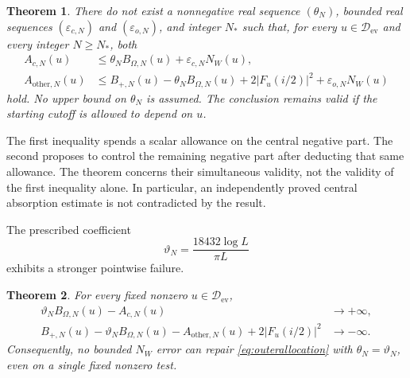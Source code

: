\documentclass[11pt]{article}
\newtheorem{theorem}{Theorem}[section]
\theoremstyle{remark}
\newcommand{\core}{\mathcal D_{\mathrm{ev}}}
\newcommand{\NW}{N_W}
\numberwithin{equation}{section}
\begin{document}
\begin{theorem}\label{thm:nogo}
There do not exist a nonnegative real sequence $(\theta_N)$, bounded real sequences $(\varepsilon_{c,N})$ and $(\varepsilon_{o,N})$, and integer $N_*$ such that, for every $u\in\core$ and every integer $N\ge N_*$, both
\begin{align}
 A_{c,N}(u)&\le\theta_NB_{\Omega,N}(u)+\varepsilon_{c,N}\NW(u),\label{eq:centralallocation}\\
 A_{\mathrm{other},N}(u)&\le B_{+,N}(u)-\theta_NB_{\Omega,N}(u)
       +2|F_u(i/2)|^2+\varepsilon_{o,N}\NW(u)\label{eq:outerallocation}
\end{align}
 hold. No upper bound on $\theta_N$ is assumed. The conclusion remains valid if the starting cutoff is allowed to depend on $u$.
\end{theorem}

The first inequality spends a scalar allowance on the central negative part. The second proposes to control the remaining negative part after deducting that same allowance. The theorem concerns their simultaneous validity, not the validity of the first inequality alone. In particular, an independently proved central absorption estimate is not contradicted by the result.

The prescribed coefficient
\begin{equation}\label{eq:prescribed}
 \vartheta_N=\frac{18432\log L}{\pi L}
\end{equation}
exhibits a stronger pointwise failure.
\begin{theorem}\label{thm:prescribed}
For every fixed nonzero $u\in\core$,
\begin{align}
 \vartheta_NB_{\Omega,N}(u)-A_{c,N}(u)&\longrightarrow+\infty,\label{eq:slackdivergence}\\
 B_{+,N}(u)-\vartheta_NB_{\Omega,N}(u)-A_{\mathrm{other},N}(u)
       +2|F_u(i/2)|^2&\longrightarrow-\infty.\label{eq:residualdivergence}
\end{align}
Consequently, no bounded $\NW$ error can repair \eqref{eq:outerallocation} with $\theta_N=\vartheta_N$, even on a single fixed nonzero test.
\end{theorem}
\end{document}
